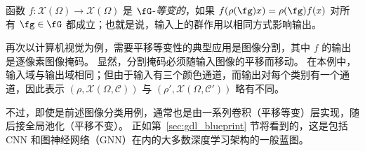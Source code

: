 \begin{tcolorbox}[width=\linewidth,
                  boxsep=0pt,
                  left=7.5pt,
                  right=7.5pt,
                  top=7.5pt,
                  bottom=7.5pt,
                  arc=0pt,
                  boxrule=0pt,toprule=0pt,
                  colback=boxgray,
                  ]%
    函数 $f: \mathcal{X}(\Omega) \rightarrow \mathcal{X}(\Omega)$ 是 $\fG$-{\em 等变的}，如果 
    $f(\rho(\fg)x) = \rho(\fg) f(x)$ 对所有 $\fg \in \fG$ 都成立；也就是说，输入上的群作用以相同方式影响输出。
\end{tcolorbox}




再次以计算机视觉为例，需要平移等变性的典型应用是图像分割，其中 $f$ 的输出是逐像素图像掩码。
%
显然，分割掩码必须随输入图像的平移而移动。
在本例中，输入域与输出域相同；但由于输入有三个颜色通道，而输出对每个类别有一个通道，因此表示 $(\rho, \mathcal{X}(\Omega, \mathcal{C}))$ 与 $(\rho', \mathcal{X}(\Omega, \mathcal{C}'))$ 略有不同。


不过，即使是前述图像分类用例，通常也是由一系列卷积（平移等变）层实现，随后接全局池化（平移不变）。
%
正如第~\ref{sec:gdl_blueprint} 节将看到的，这是包括 CNN 和图神经网络（GNN）在内的大多数深度学习架构的一般蓝图。




